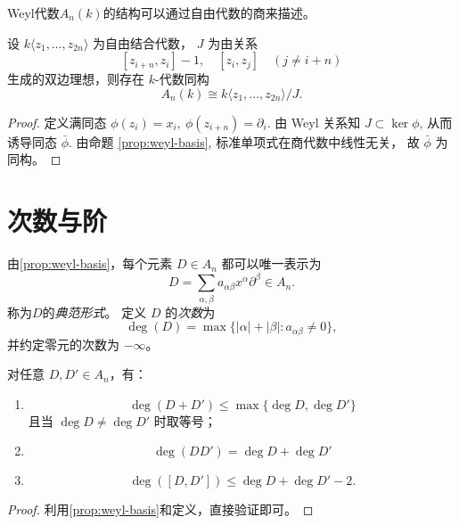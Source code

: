 \documentclass[12pt,a4paper]{ctexrep}   %
\begin{document}
Weyl代数$A_n(k)$的结构可以通过自由代数的商来描述。

\begin{theorem}
    \label{thm:A}
    设 $k\langle z_1,\dots,z_{2n}\rangle$
    为自由结合代数，
    $J$ 为由关系
    \[
        [z_{i+n},z_i]-1,\quad
        [z_i,z_j]\quad (j\neq i+n)
    \]
    生成的双边理想，则存在 $k$-代数同构
    \[
        A_n(k)\cong k\langle z_1,\dots,z_{2n}\rangle/J.
    \]
\end{theorem}

\begin{proof}
    定义满同态
    $\phi(z_i)=x_i,\ \phi(z_{i+n})=\partial_i$.
    由 Weyl 关系知 $J\subset\ker\phi$,
    从而诱导同态
    $\bar\phi$.
    由命题 \ref{prop:weyl-basis},
    标准单项式在商代数中线性无关，
    故 $\bar\phi$ 为同构。
\end{proof}

\section{次数与阶}

\begin{definition}
    由\ref{prop:weyl-basis}，每个元素 $D\in A_n$ 都可以唯一表示为
    \begin{equation*}
        D=\sum_{\alpha,\beta}
        a_{\alpha\beta}x^\alpha\partial^\beta\in A_n.
    \end{equation*}
    称为$D$的\emph{典范形式}。
    定义 $D$ 的\emph{次数}为
    \[
        \deg(D)=\max\{|\alpha|+|\beta|:
        a_{\alpha\beta}\neq0\},
    \]
    并约定零元的次数为 $-\infty$。
\end{definition}

\begin{theorem}
    对任意 $D,D'\in A_n$，有：
    \begin{enumerate}
        \item
              \[
                  \deg(D+D')\le\max\{\deg D,\deg D'\}
              \]
              且当 $\deg D\neq\deg D'$ 时取等号；
        \item
              \[
                  \deg(DD')=\deg D+\deg D'
              \]
        \item
              \[
                  \deg([D,D'])\le\deg D+\deg D'-2.
              \]
    \end{enumerate}
    \begin{proof}
        利用\ref{prop:weyl-basis}和定义，直接验证即可。
    \end{proof}
\end{theorem}
\end{document}
